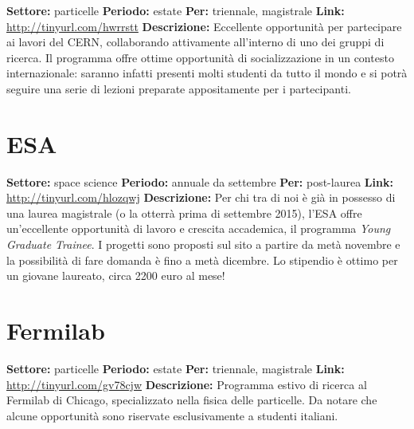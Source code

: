 \documentclass[a4paper,10pt]{article}
\begin{document}
\textbf{Settore:} particelle \newline %
\textbf{Periodo:} estate \newline
\textbf{Per:} triennale, magistrale \newline
\textbf{Link:}	\url{http://tinyurl.com/hwrrstt} \newline %
\textbf{Descrizione:} Eccellente opportunità per partecipare ai lavori del CERN, collaborando attivamente all’interno di uno dei gruppi di ricerca. Il programma offre ottime opportunità di socializzazione in un contesto internazionale: saranno infatti presenti molti studenti da tutto il mondo e si potrà seguire una serie di lezioni preparate appositamente per i partecipanti.	


\section{ESA} 

\textbf{Settore:} space science \newline
\textbf{Periodo:} annuale da settembre \newline
\textbf{Per:} post-laurea \newline
\textbf{Link:} \url{http://tinyurl.com/hlozqwj} \newline
\textbf{Descrizione:} Per chi tra di noi è già in possesso di una laurea magistrale (o la otterrà prima di settembre 2015), l'ESA offre un'eccellente opportunità di lavoro e crescita accademica, il programma \emph{Young Graduate Trainee}. I progetti sono proposti sul sito a partire da metà novembre e la possibilità di fare domanda è fino a metà dicembre. Lo stipendio è ottimo per un giovane laureato, circa 2200 euro al mese!


\section{Fermilab}

\textbf{Settore:} particelle \newline
\textbf{Periodo:} estate \newline
\textbf{Per:} triennale, magistrale \newline
\textbf{Link:} \url{http://tinyurl.com/gv78cjw} \newline
\textbf{Descrizione:} Programma estivo di ricerca al Fermilab di Chicago, specializzato nella fisica delle particelle. Da notare che alcune opportunità sono riservate esclusivamente a studenti italiani.	
\end{document}
